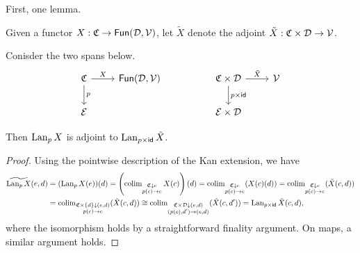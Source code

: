 \documentclass[a4paper,10pt
,draft
]{article}%
\renewcommand{\1}{\eta}%
\begin{document}
First, one lemma.

\begin{notation}
      Given a functor $X : \mathfrak C \to \mathsf{Fun}(\mathcal D, \mathcal V)$,
      let $\tilde X$ denote the adjoint $\tilde X: \mathfrak C \times \mathcal D \to \mathcal V$.
\end{notation}

\begin{lemma}
      \label{SPAN_LAN_LEM}
      Conisder the two spans below.
      \begin{equation}
            \begin{tikzcd}
                  \C \arrow[d, "p"] \arrow[r, "X"]
                  &
                  \mathsf{Fun}(\mathcal D, \V)
                  &&
                  \C \times \mathcal D \arrow[d, "p \times \mathsf{id}"] \arrow[r, "\tilde X"]
                  &
                  \V
                  \\
                  \mathcal E
                  &
                  &&
                  \mathcal E \times \mathcal D
            \end{tikzcd}
      \end{equation}
      
      Then $\operatorname{Lan}_p X$ is adjoint to $\operatorname{Lan}_{p \times \mathsf{id}} \tilde X$. 
\end{lemma}
\begin{proof}
      Using the pointwise description of the Kan extension, we have
      \begin{align}
        \widetilde{\operatorname{Lan}_p X}(e,d)
        &= (\operatorname{Lan}_p X(e))(d)
          = \left(
          \operatorname{colim}\limits_{\substack{ \mathfrak C \downarrow e \\ p(c) \to e}} X(c)
        \right)(d)
        = \operatorname{colim}\limits_{\substack{ \mathfrak C \downarrow e \\ p(c) \to e}}(X(c)(d))
        = \operatorname{colim}\limits_{\substack{ \mathfrak C \downarrow e \\ p(c) \to e}}(\tilde X(c,d))\\
        &= \operatorname{colim}\limits_{\substack{ \mathfrak C \times \left\{d\right\} \downarrow (e,d) \\ p(c) \to e}}(\tilde X(c,d))
        \cong \operatorname{colim}\limits_{\substack{ \mathfrak C \times \mathcal D \downarrow (e,d) \\ (p(c),d') \to (e,d)}}(\tilde X(c,d'))
        = \operatorname{Lan}_{p \times \mathsf{id}}\tilde X(c,d),
      \end{align}
      where the isomorphism holds by a straightforward finality argument.
      On maps, a similar argument holds.
\end{proof}
\end{document}
